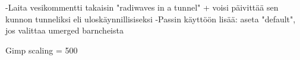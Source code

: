 -Laita vesikommentti takaisin "radiwaves in a tunnel" + voisi päivittää sen kunnon tunneliksi eli uloskäynnillisiseksi
-Passin käyttöön lisää: aseta "default", jos valittaa umerged barncheista

Gimp scaling = 500 
